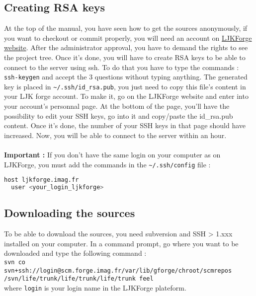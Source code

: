\subsection{Creating RSA keys}
\label{sec:creation-rsa-keys}
At the top of the manual, you have seen how to get the sources anonymously, if you want to checkout or commit properly, you will need an account on \href{https://forge.imag.fr/}{LJKForge website}. After the administrator approval, you have to demand the rights to see the project tree. \newline \newline
Once it's done, you will have to create RSA keys to be able to connect to the server using ssh. To do that you have to type the commands : \verb|ssh-keygen| and accept the 3 questions without typing anything. The generated key is placed in \verb|~/.ssh/id_rsa.pub|, you just need to copy this file's content in your LJK forge account. To make it, go on the LJKForge website and enter into your account's personnal page. At the bottom of the page, you'll have the possibility to edit your SSH keys, go into it and copy/paste the id\_rsa.pub content. Once it's done, the number of your SSH keys in that page should have increased. Now, you will be able to connect to the server within an hour.
\\ \\
{\bfseries Important : } If you don't have the same login on your computer as on
LJKForge, you must add the commands in the \verb|~/.ssh/config| file :
\begin{lstlisting}[language=sh]
host ljkforge.imag.fr
  user <your_login_ljkforge>
\end{lstlisting}


\subsection{Downloading the sources}
\label{sec:download-sources}

To be able to download the \feel sources, you need subversion and SSH > 1.xxx
installed on your computer. In a command prompt, go where you want \feel to be
downloaded and type the following command :
\\ \verb|svn co svn+ssh://login@scm.forge.imag.fr/var/lib/gforge/chroot/scmrepos|
\\ \verb|/svn/life/trunk/life/trunk/life/trunk feel|
\\ where \verb|login| is your login name in the LJKForge plateform.

